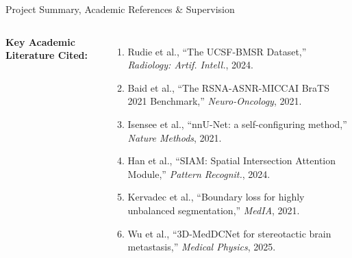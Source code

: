 \documentclass[aspectratio=169, 10pt]{beamer}
\begin{document}
\begin{frame}{Project Summary, Academic References \& Supervision}
\begin{columns}[T]
    \vspace{0.15cm}
    \textbf{Key Academic Literature Cited:}
    \begin{enumerate}\itemsep=1.5pt
      \tiny
      \item Rudie et al., ``The UCSF-BMSR Dataset,'' \textit{Radiology: Artif. Intell.}, 2024.
      \item Baid et al., ``The RSNA-ASNR-MICCAI BraTS 2021 Benchmark,'' \textit{Neuro-Oncology}, 2021.
      \item Isensee et al., ``nnU-Net: a self-configuring method,'' \textit{Nature Methods}, 2021.
      \item Han et al., ``SIAM: Spatial Intersection Attention Module,'' \textit{Pattern Recognit.}, 2024.
      \item Kervadec et al., ``Boundary loss for highly unbalanced segmentation,'' \textit{MedIA}, 2021.
      \item Wu et al., ``3D-MedDCNet for stereotactic brain metastasis,'' \textit{Medical Physics}, 2025.
    \end{enumerate}
  \end{columns}
\end{frame}
\end{document}
